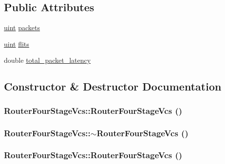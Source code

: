\subsection*{Public Attributes}
\begin{CompactItemize}
\item 
\hyperlink{outputBuffer_8h_91ad9478d81a7aaf2593e8d9c3d06a14}{uint} \hyperlink{classRouterFourStageVcs_1e53bbb456e2c8eb52e390ef02be6a6f}{packets}
\item 
\hyperlink{outputBuffer_8h_91ad9478d81a7aaf2593e8d9c3d06a14}{uint} \hyperlink{classRouterFourStageVcs_0a012c5ae87d8e9bc3fe769b8b8c1c46}{flits}
\item 
double \hyperlink{classRouterFourStageVcs_cbb2aaae4a28ad865be0f360d6a8e95f}{total\_\-packet\_\-latency}
\end{CompactItemize}


\subsection{Constructor \& Destructor Documentation}
\hypertarget{classRouterFourStageVcs_4ab2afa09beddb03b1c2e1a9658c4ffd}{
\subsubsection[{RouterFourStageVcs}]{\setlength{\rightskip}{0pt plus 5cm}RouterFourStageVcs::RouterFourStageVcs ()}}
\label{classRouterFourStageVcs_4ab2afa09beddb03b1c2e1a9658c4ffd}


\hypertarget{classRouterFourStageVcs_d81c40fe3a0d48cf9e6475b3ad9b3f33}{
\subsubsection[{$\sim$RouterFourStageVcs}]{\setlength{\rightskip}{0pt plus 5cm}RouterFourStageVcs::$\sim$RouterFourStageVcs ()}}
\label{classRouterFourStageVcs_d81c40fe3a0d48cf9e6475b3ad9b3f33}


\hypertarget{classRouterFourStageVcs_4ab2afa09beddb03b1c2e1a9658c4ffd}{
\subsubsection[{RouterFourStageVcs}]{\setlength{\rightskip}{0pt plus 5cm}RouterFourStageVcs::RouterFourStageVcs ()}}
\label{classRouterFourStageVcs_4ab2afa09beddb03b1c2e1a9658c4ffd}


